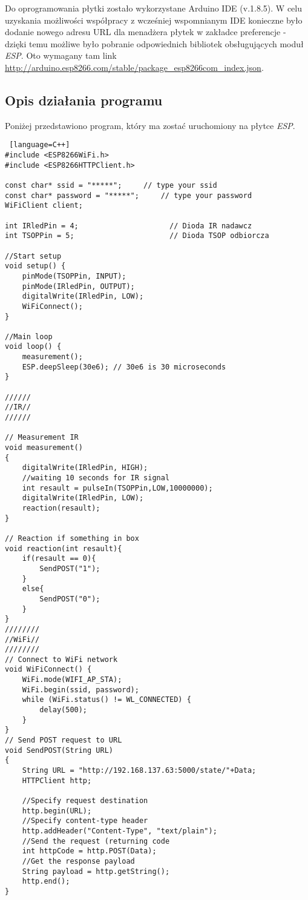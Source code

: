 Do oprogramowania płytki zostało wykorzystane Arduino IDE (v.1.8.5). W celu uzyskania możliwości współpracy z wcześniej wspomnianym IDE konieczne było dodanie nowego adresu URL dla menadżera płytek w zakładce preferencje - dzięki temu możliwe było pobranie odpowiednich bibliotek obsługujących moduł \emph{ESP}. Oto wymagany tam link \url{http://arduino.esp8266.com/stable/package_esp8266com_index.json}.

\subsection{Opis działania programu}

Poniżej przedstawiono program, który ma zostać uruchomiony na płytce \emph{ESP}.

\begin{lstlisting} [language=C++]
#include <ESP8266WiFi.h>
#include <ESP8266HTTPClient.h>

const char* ssid = "*****";		// type your ssid
const char* password = "*****";		// type your password
WiFiClient client;

int IRledPin = 4;                     // Dioda IR nadawcz
int TSOPPin = 5;                      // Dioda TSOP odbiorcza

//Start setup
void setup() {
	pinMode(TSOPPin, INPUT);
	pinMode(IRledPin, OUTPUT);
	digitalWrite(IRledPin, LOW);
	WiFiConnect();
}

//Main loop
void loop() {
	measurement();
	ESP.deepSleep(30e6); // 30e6 is 30 microseconds
}

//////
//IR//
//////

// Measurement IR
void measurement()
{
	digitalWrite(IRledPin, HIGH);
	//waiting 10 seconds for IR signal
	int resault = pulseIn(TSOPPin,LOW,10000000);
	digitalWrite(IRledPin, LOW);
	reaction(resault);
}

// Reaction if something in box
void reaction(int resault){
	if(resault == 0){
		SendPOST("1");
	}
	else{
		SendPOST("0");
	}
}
////////
//WiFi//
////////
// Connect to WiFi network
void WiFiConnect() {
	WiFi.mode(WIFI_AP_STA);
	WiFi.begin(ssid, password);
	while (WiFi.status() != WL_CONNECTED) {
		delay(500);
	}
}
// Send POST request to URL
void SendPOST(String URL)
{
	String URL = "http://192.168.137.63:5000/state/"+Data;
	HTTPClient http;
	
	//Specify request destination
	http.begin(URL);		
	//Specify content-type header
	http.addHeader("Content-Type", "text/plain");	
	//Send the request (returning code
	int httpCode = http.POST(Data);			
	//Get the response payload
	String payload = http.getString();              
	http.end();
}
\end{lstlisting}

